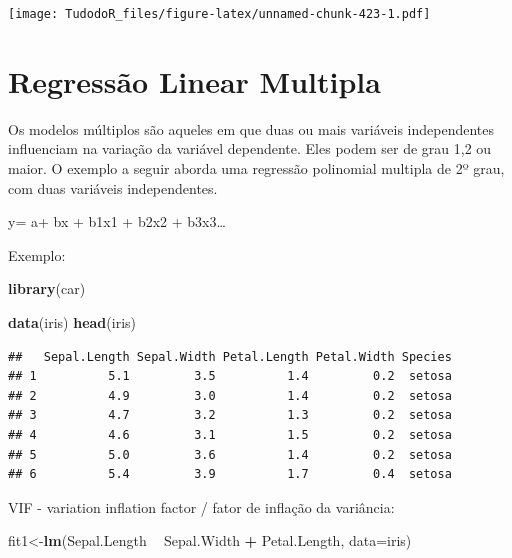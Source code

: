 \documentclass[
]{book}
\newenvironment{Shaded}{\begin{snugshade}}{\end{snugshade}}
\newcommand{\DataTypeTok}[1]{\textcolor[rgb]{0.13,0.29,0.53}{#1}}
\newcommand{\KeywordTok}[1]{\textcolor[rgb]{0.13,0.29,0.53}{\textbf{#1}}}
\newcommand{\NormalTok}[1]{#1}
\newcommand{\OperatorTok}[1]{\textcolor[rgb]{0.81,0.36,0.00}{\textbf{#1}}}
\newcommand{\StringTok}[1]{\textcolor[rgb]{0.31,0.60,0.02}{#1}}
\begin{document}
\texttt{[image: TudodoR\_files/figure-latex/unnamed-chunk-423-1.pdf]}

\hypertarget{regressuxe3o-linear-multipla}{%
\section{Regressão Linear Multipla}\label{regressuxe3o-linear-multipla}}

Os modelos múltiplos são aqueles em que duas ou mais variáveis independentes influenciam na variação da variável dependente. Eles podem ser de grau 1,2 ou maior. O exemplo a seguir aborda uma regressão polinomial multipla de 2º grau, com duas variáveis independentes.

y= a+ bx + b1x1 + b2x2 + b3x3\ldots{}

Exemplo:

\begin{Shaded}
\begin{Highlighting}[]
\KeywordTok{library}\NormalTok{(car)}
\end{Highlighting}
\end{Shaded}

\begin{Shaded}
\begin{Highlighting}[]
\KeywordTok{data}\NormalTok{(iris)}
\KeywordTok{head}\NormalTok{(iris)}
\end{Highlighting}
\end{Shaded}

\begin{verbatim}
##   Sepal.Length Sepal.Width Petal.Length Petal.Width Species
## 1          5.1         3.5          1.4         0.2  setosa
## 2          4.9         3.0          1.4         0.2  setosa
## 3          4.7         3.2          1.3         0.2  setosa
## 4          4.6         3.1          1.5         0.2  setosa
## 5          5.0         3.6          1.4         0.2  setosa
## 6          5.4         3.9          1.7         0.4  setosa
\end{verbatim}

VIF - variation inflation factor / fator de inflação da variância:

\begin{Shaded}
\begin{Highlighting}[]
\NormalTok{fit1<-}\KeywordTok{lm}\NormalTok{(Sepal.Length }\OperatorTok{~}\StringTok{ }\NormalTok{Sepal.Width }\OperatorTok{+}\StringTok{ }\NormalTok{Petal.Length, }\DataTypeTok{data=}\NormalTok{iris)}
\end{Highlighting}
\end{Shaded}
\end{document}
